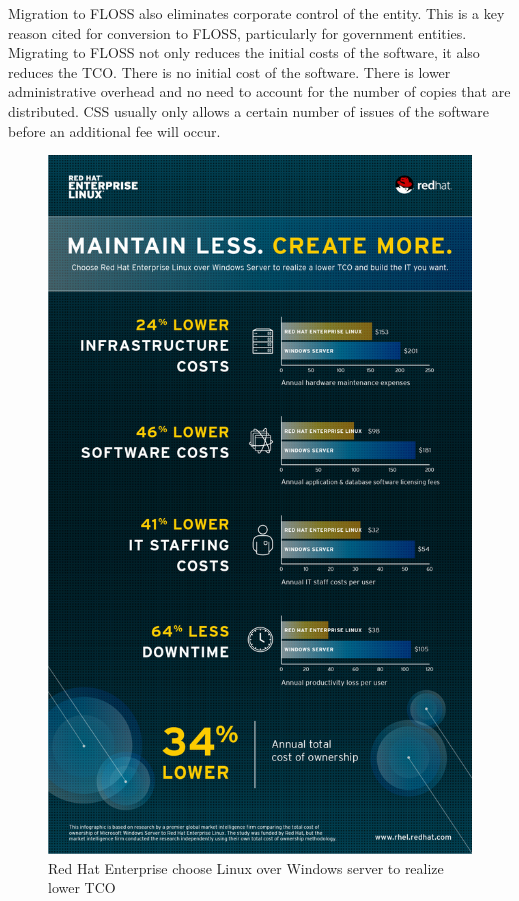   Migration to FLOSS also eliminates corporate control of the entity. This is a key reason cited for conversion to FLOSS, particularly for government entities. Migrating to FLOSS
 not only reduces the initial costs of the software, it also reduces the \ac{TCO}. There is no initial cost of the software. There is lower administrative overhead and no need to account for the number of copies that are distributed. CSS usually only allows a certain number of issues of the software before an additional fee will occur.  
  \begin{figure}[H]
     \begin{center}
        \includegraphics[scale=0.4]{img/RHELFancy.png}
       \caption[Red Hat realize lower TCO] {Red Hat Enterprise choose Linux over Windows server to realize lower TCO \protect\footnotemark}
       \label{fig:RedHat}
     \end{center}
       \end{figure}
